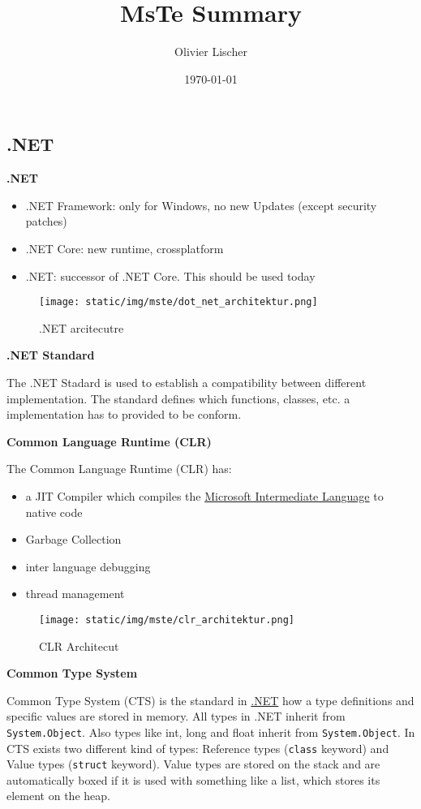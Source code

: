 \documentclass[11pt,twoside,landscape]{article}
\author{Olivier Lischer}
\date{\today}
\title{MsTe Summary}
\begin{document}
\pagestyle{fancy}
\fancyhf{}
\fancyfoot[CE,CO]{\leftmark}
\fancyfoot[R]{\thepage}
\begin{multicols}{3}

\section{.NET}
\label{sec:org8e646cc}
\textbf{.NET}

\begin{itemize}
\item .NET Framework: only for Windows, no new Updates (except security patches)
\item .NET Core: new runtime, crossplatform
\item .NET: successor of .NET Core. This should be used today
\end{itemize}

\begin{figure}[htbp]
\centering
\texttt{[image: static/img/mste/dot\_net\_architektur.png]}
\caption{\label{fig:orge2950db}.NET arcitecutre}
\end{figure}

\textbf{.NET Standard}

The .NET Stadard is used to establish a compatibility between different implementation.
The standard defines which functions, classes, etc. a implementation has to provided to be conform. 

\textbf{Common Language Runtime (CLR)}

The Common Language Runtime (CLR) has:
\begin{itemize}
\item a JIT Compiler which compiles the \href{../../../roam/20211003114528-microsoft_intermediate_language.org}{Microsoft Intermediate Language} to native code
\item Garbage Collection
\item inter language debugging
\item thread management
\end{itemize}


\begin{figure}[htbp]
\centering
\texttt{[image: static/img/mste/clr\_architektur.png]}
\caption{\label{fig:org7cc7e5c}CLR Architecut}
\end{figure}

\textbf{Common Type System}

Common Type System (CTS) is the standard in \href{../../../roam/20211003114703-net.org}{.NET} how a type definitions and specific values are stored in memory.
All types in .NET inherit from \texttt{System.Object}. Also types like int, long and float inherit from \texttt{System.Object}. In CTS exists two different kind of types: Reference types (\texttt{class} keyword) and Value types (\texttt{struct} keyword). Value types are stored on the stack and are automatically boxed if it is used with something like a list, which stores its  element on the heap. 


\end{multicols}
\end{document}
